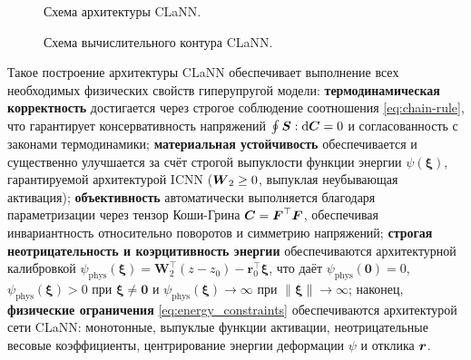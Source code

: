 \begin{figure}[H]
  \centering
  \resizebox{\textwidth}{!}{}
  \caption{Схема архитектуры CLaNN.}
  \label{fig:clann_arc}
  \label{fig:clann_icnn1_nn}
\end{figure}

\begin{figure}[H]
  \centering
  \resizebox{\textwidth}{!}{}
  \caption{Схема вычислительного контура CLaNN.}
  \label{fig:clann_pipeline}
\end{figure}

Такое построение архитектуры CLaNN обеспечивает выполнение всех необходимых физических свойств гиперупругой модели: 
\textbf{термодинамическая корректность} достигается через строгое соблюдение соотношения \eqref{eq:chain-rule}, 
что гарантирует консервативность напряжений $\oint \boldsymbol{S}:\mathrm{d}\boldsymbol{C} = 0$ и согласованность с законами 
термодинамики; 
\textbf{материальная устойчивость} обеспечивается и существенно улучшается за счёт строгой выпуклости функции энергии 
$\psi(\boldsymbol{\xi})$, гарантируемой архитектурой ICNN ($\boldsymbol{W}_2 \ge 0$, выпуклая неубывающая активация); 
\textbf{объективность} автоматически выполняется благодаря параметризации через тензор 
Коши-Грина $\boldsymbol{C} = \boldsymbol{F}^{\top}\boldsymbol{F}$, обеспечивая инвариантность относительно поворотов и симметрию напряжений; 
\textbf{строгая неотрицательность и коэрцитивность энергии} обеспечиваются архитектурной калибровкой 
$\psi_{\mathrm{phys}}(\boldsymbol{\xi}) = \mathbf{W}_2^{\top}(z - z_0) - \mathbf{r}_0^{\top}\boldsymbol{\xi}$,
что даёт $\psi_{\mathrm{phys}}(\mathbf{0})=0$, $\psi_{\mathrm{phys}}(\boldsymbol{\xi})>0$ при $\boldsymbol{\xi}\ne\mathbf{0}$ и 
$\psi_{\mathrm{phys}}(\boldsymbol{\xi})\to\infty$ при $\|\boldsymbol{\xi}\|\to\infty$; 
наконец, \textbf{физические ограничения} \eqref{eq:energy_constraints} обеспечиваются архитектурой сети CLaNN: монотонные, выпуклые функции активации,
неотрицательные весовые коэффициенты, центрирование энергии деформации $\psi$ и отклика $\boldsymbol{r}$.


